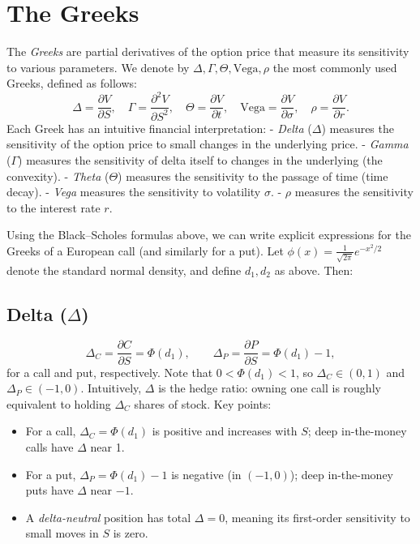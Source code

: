 \section{The Greeks}
The \emph{Greeks} are partial derivatives of the option price that measure its sensitivity to various parameters.  We denote by \(\Delta, \Gamma, \Theta, \mathrm{Vega}, \rho\) the most commonly used Greeks, defined as follows:
\[
\Delta = \frac{\partial V}{\partial S}, 
\quad
\Gamma = \frac{\partial^2 V}{\partial S^2},
\quad
\Theta = \frac{\partial V}{\partial t}, 
\quad
\mathrm{Vega} = \frac{\partial V}{\partial \sigma}, 
\quad
\rho = \frac{\partial V}{\partial r}.
\]
Each Greek has an intuitive financial interpretation:
- \emph{Delta} (\(\Delta\)) measures the sensitivity of the option price to small changes in the underlying price.
- \emph{Gamma} (\(\Gamma\)) measures the sensitivity of delta itself to changes in the underlying (the convexity).
- \emph{Theta} (\(\Theta\)) measures the sensitivity to the passage of time (time decay).
- \emph{Vega} measures the sensitivity to volatility \(\sigma\).
- \(\rho\) measures the sensitivity to the interest rate \(r\). 

Using the Black--Scholes formulas above, we can write explicit expressions for the Greeks of a European call (and similarly for a put).  Let \(\phi(x)=\frac{1}{\sqrt{2\pi}}e^{-x^2/2}\) denote the standard normal density, and define \(d_1,d_2\) as above.  Then:

\subsection*{Delta (\(\Delta\))}
\[
\Delta_C = \frac{\partial C}{\partial S} = \Phi(d_1), 
\qquad
\Delta_P = \frac{\partial P}{\partial S} = \Phi(d_1) - 1,
\]
for a call and put, respectively.  Note that \(0<\Phi(d_1)<1\), so \(\Delta_C\in(0,1)\) and \(\Delta_P\in(-1,0)\).  Intuitively, \(\Delta\) is the hedge ratio: owning one call is roughly equivalent to holding \(\Delta_C\) shares of stock.  Key points:
\begin{itemize}
    \item For a call, \(\Delta_C = \Phi(d_1)\) is positive and increases with \(S\); deep in-the-money calls have \(\Delta\) near 1.
    \item For a put, \(\Delta_P = \Phi(d_1)-1\) is negative (in \((-1,0)\)); deep in-the-money puts have \(\Delta\) near \(-1\).
    \item A \emph{delta-neutral} position has total \(\Delta = 0\), meaning its first-order sensitivity to small moves in \(S\) is zero.
\end{itemize}

